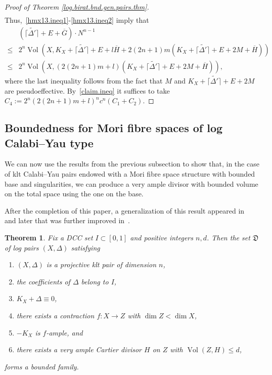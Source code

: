 \documentclass{amsart}[12pt,a4paper]
\newtheorem{theorem}{Theorem}[section]
\theoremstyle{definition}
\DeclareMathOperator{\Vol}{\mathrm{Vol}}
\begin{document}
\begin{proof}[Proof of Theorem \ref{log.birat.bnd.gen.pairs.thm}]
\begin{align}
\end{align}
Thus,~\eqref{hmx13.ineq1}-\eqref{hmx13.ineq2} imply that
\begin{align*}
&(\lceil \widetilde{\Delta'}\rceil+ E + \overline G) \cdot N^{n-1}
\\
\leq & 2^n \Vol(X, K_X+\lceil \widetilde{\Delta'}\rceil+ E+l\overline{H} + 2(2n+1) m(K_X+\lceil \widetilde{\Delta'}\rceil+ E+ 2M + \overline{H}))  \\
\leq & 2^n \Vol(X, (2(2n+1)m+l) (K_X+ \lceil\widetilde{\Delta'}\rceil+ E+ 2M + \overline{H})),
\end{align*}
where the last inequality follows from the fact that $M$ and $K_X+ \lceil\widetilde{\Delta'}\rceil+ E+ 2M$ are pseudoeffective.
By~\eqref{claim.ineq} it suffices to take $C_4:= 2^n(2(2n+1)m+l)^nc^n (C_1+C_2)$.
\end{proof}



\subsection{Boundedness for Mori fibre spaces of log Calabi--Yau type}

We can now use the results from the previous subsection to show that, in the case of klt Calabi--Yau pairs endowed with a Mori fibre space structure with bounded base and singularities, we can produce a very ample divisor with bounded volume on the total space using the one on the base. 

After the completion of this paper, a generalization of this result appeared in~\cite[Theorem~4.6]{rccy3} and later that was further improved in~\cite[Theorem~1.2]{birkar.lcy.fibr}.

\begin{theorem}\label{bound.MFS.thm}
	Fix a DCC set $I\subset [0,1]$ and positive integers $n, d$. 
	Then the set $\mathfrak{D}$ of log pairs $(X, \Delta)$
	satisfying 
	\begin{enumerate}
		\item $(X, \Delta )$ is a projective klt pair of dimension $n$,
		\item the coefficients of $\Delta$ belong to $I$,
		\item $K_X+\Delta \equiv 0$,
	  	\item there exists a contraction $f\colon X\to Z$ with $\dim Z < \dim X$, 
	  	\item $-K_X$ is $f$-ample, and
		\item there exists a very ample Cartier divisor $H$ on $Z$ with $\Vol(Z,H)\leq d$,
	\end{enumerate}
	forms a bounded family.
\end{theorem}	  
\end{document}
